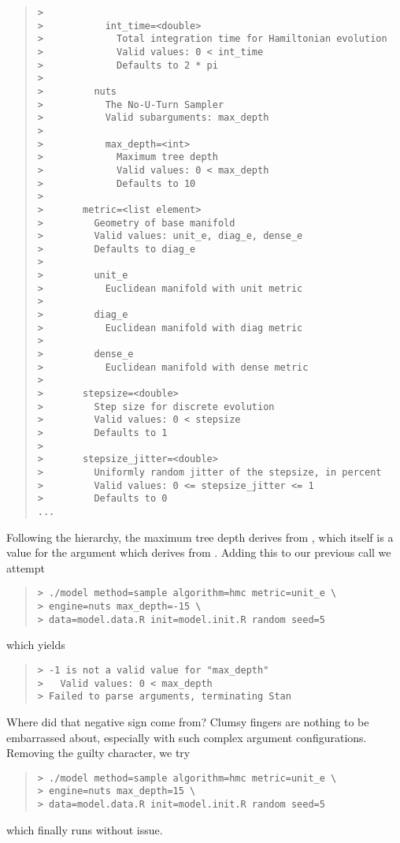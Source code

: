\begin{quote}
\begin{Verbatim}[fontshape=sl,fontsize=\small]
> 
>           int_time=<double>
>             Total integration time for Hamiltonian evolution
>             Valid values: 0 < int_time
>             Defaults to 2 * pi
> 
>         nuts
>           The No-U-Turn Sampler
>           Valid subarguments: max_depth
> 
>           max_depth=<int>
>             Maximum tree depth
>             Valid values: 0 < max_depth
>             Defaults to 10
> 
>       metric=<list element>
>         Geometry of base manifold
>         Valid values: unit_e, diag_e, dense_e
>         Defaults to diag_e
> 
>         unit_e
>           Euclidean manifold with unit metric
> 
>         diag_e
>           Euclidean manifold with diag metric
> 
>         dense_e
>           Euclidean manifold with dense metric
> 
>       stepsize=<double>
>         Step size for discrete evolution
>         Valid values: 0 < stepsize
>         Defaults to 1
> 
>       stepsize_jitter=<double>
>         Uniformly random jitter of the stepsize, in percent
>         Valid values: 0 <= stepsize_jitter <= 1
>         Defaults to 0
...
\end{Verbatim}
\end{quote}
%
Following the hierarchy, the maximum tree depth derives from ,
which itself is a value for the argument  which derives from
.  Adding this to our previous call we attempt
%
\begin{quote}
\begin{Verbatim}[fontshape=sl,fontsize=\small]
> ./model method=sample algorithm=hmc metric=unit_e \
> engine=nuts max_depth=-15 \
> data=model.data.R init=model.init.R random seed=5
\end{Verbatim}
\end{quote}
%
which yields
%
\begin{quote}
\begin{Verbatim}[fontshape=sl,fontsize=\small]
> -1 is not a valid value for "max_depth"
>   Valid values: 0 < max_depth
> Failed to parse arguments, terminating Stan
\end{Verbatim}
\end{quote}
%
Where did that negative sign come from?  Clumsy fingers are nothing
to be embarrassed about, especially with such complex argument 
configurations.  Removing the guilty character, we try
%
\begin{quote}
\begin{Verbatim}[fontshape=sl,fontsize=\small]
> ./model method=sample algorithm=hmc metric=unit_e \
> engine=nuts max_depth=15 \
> data=model.data.R init=model.init.R random seed=5
\end{Verbatim}
\end{quote}
%
which finally runs without issue.

